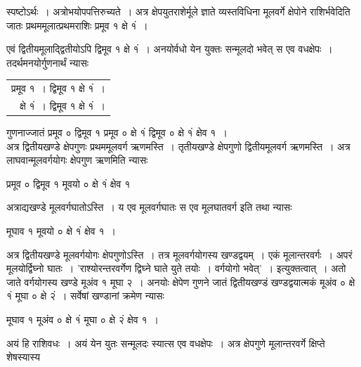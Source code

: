 \documentclass[11pt, openany]{book}
\begin{document}
 स्पष्टोऽर्थः~। अत्रोभयोपपत्तिरुच्यते~। अत्र क्षेपयुतराशेर्मूले ज्ञाते
व्यस्तविधिना मूलवर्गे क्षेपोने राशिर्भवेदिति जातः प्रथममूलात्प्रथमराशिः प्रमूव १
क्षे १ं~।
 \newpage %

एवं द्वितीयमूलाद्द्वितीयोऽपि द्विमूव १ क्षे १ं~। अनयोर्वधो येन
युक्तः सन्मूलदो भवेत् स एव वधक्षेपः~। तदर्थमनयोर्गुणनार्थं न्यासः 

\vspace{-2mm}
\begin{table}[h!]
    \centering\s
    \begin{tabular}{r}
      प्रमूव १~। द्विमूव १ क्षे १ं~। \\
क्षे १ं~। द्विमूव १ क्षे १ं~। 
\end{tabular}
\end{table}
\vspace{-2mm}

\noindent गुणनाज्जातं प्रमूव ० द्विमूव १ प्रमूव ० क्षे १ं द्विमूव ० क्षे १ं क्षेव १~। \\

\vspace{-4mm}
 अत्र द्वितीयखण्डे क्षेपगुणः प्रथममूलवर्ग ऋणमस्ति~। तृतीयखण्डे
क्षेपगुणो द्वितीयमूलवर्ग ऋणमस्ति~। अत्र लाघवान्मूलवर्गयोगः क्षेपगुण ऋणमिति
न्यासः 
\begin{center}
     प्रमूव ० द्विमूव १ मूवयो ० क्षे १ं क्षेव १ 
\end{center}

 अत्राद्यखण्डे मूलवर्गघातोऽस्ति~। य एव मूलवर्गघातः स एव मूलघातवर्ग 
इति तथा न्यासः 
\vspace{-4mm}

\begin{center}
     मूघाव १ मूवयो ० क्षे १ं क्षेव १~। 
\end{center}

 अत्र द्वितीयखण्डे मूलवर्गयोगः क्षेपगुणोऽस्ति~। तत्र मूलवर्गयोगस्य
खण्डद्वयम्~। 
एकं मूलान्तरवर्गः~। अपरं मूलयोर्द्विघ्नो घातः~। {\qt 'राश्योरन्तरवर्गेण द्विघ्ने घाते युते तयोः~। वर्गयोगो भवेत्'}~। इत्युक्तत्वात्~। अतो जाते वर्गयोगस्य खण्डे मूअंव १ मूघा २~। अनयोः क्षेपेण गुणने जातं द्वितीयखण्डं खण्डद्वयात्मकं मूअंव ० क्षे १ं मूघा ० क्षे २ं~। सर्वेषां खण्डानां क्रमेण न्यासः 
\vspace{-2mm}

\begin{center}
  मूघाव १ मूअंव ० क्षे १ं मूघा ० क्षे २ं क्षेव १~।  
\end{center}
 
 अयं हि राशिवधः~। अयं येन युतः सन्मूलदः स्यात्स एव वधक्षेपः~।
अत्र क्षेपगुणे मूलान्तरवर्गे क्षिप्ते शेषस्यास्य 
\vspace{-2mm}
\end{document}
